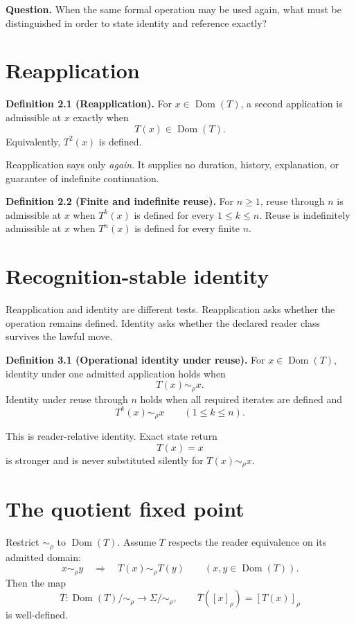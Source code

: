 \documentclass[11pt]{article}
\newcommand{\Dom}{\operatorname{Dom}}
\begin{document}
\begin{lawbox}
\centering
\textbf{Question.} When the same formal operation may be used again, what must be distinguished in order to state identity and reference exactly?
\end{lawbox}

\section{Reapplication}

\textbf{Definition 2.1 (Reapplication).}
For $x\in\Dom(T)$, a second application is admissible at $x$ exactly when
\[
T(x)\in\Dom(T).
\]
Equivalently, $T^2(x)$ is defined.

Reapplication says only \emph{again}. It supplies no duration, history, explanation, or guarantee of indefinite continuation.

\textbf{Definition 2.2 (Finite and indefinite reuse).}
For $n\ge1$, reuse through $n$ is admissible at $x$ when $T^k(x)$ is defined for every $1\le k\le n$. Reuse is indefinitely admissible at $x$ when $T^n(x)$ is defined for every finite $n$.

\section{Recognition-stable identity}

Reapplication and identity are different tests. Reapplication asks whether the operation remains defined. Identity asks whether the declared reader class survives the lawful move.

\textbf{Definition 3.1 (Operational identity under reuse).}
For $x\in\Dom(T)$, identity under one admitted application holds when
\[
\boxed{T(x)\sim_\rho x.}
\]
Identity under reuse through $n$ holds when all required iterates are defined and
\[
T^k(x)\sim_\rho x
\qquad(1\le k\le n).
\]

This is reader-relative identity. Exact state return
\[
T(x)=x
\]
is stronger and is never substituted silently for $T(x)\sim_\rho x$.

\section{The quotient fixed point}

Restrict $\sim_\rho$ to $\Dom(T)$. Assume $T$ respects the reader equivalence on its admitted domain:
\[
x\sim_\rho y
\quad\Longrightarrow\quad
T(x)\sim_\rho T(y)
\qquad(x,y\in\Dom(T)).
\]
Then the map
\[
\overline T:\Dom(T)/{\sim_\rho}\longrightarrow \Sigma/{\sim_\rho},
\qquad
\overline T([x]_\rho)=[T(x)]_\rho
\]
is well-defined.
\end{document}
